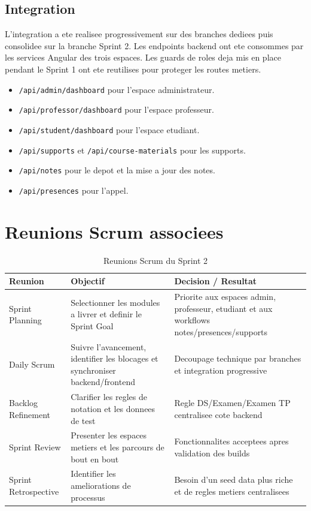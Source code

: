 \documentclass[12pt,a4paper]{report}
\begin{document}
\subsection{Integration}

L'integration a ete realisee progressivement sur des branches dediees puis consolidee sur la branche Sprint 2. Les endpoints backend ont ete consommes par les services Angular des trois espaces. Les guards de roles deja mis en place pendant le Sprint 1 ont ete reutilises pour proteger les routes metiers.

\begin{itemize}[itemsep=0.3em]
    \item \texttt{/api/admin/dashboard} pour l'espace administrateur.
    \item \texttt{/api/professor/dashboard} pour l'espace professeur.
    \item \texttt{/api/student/dashboard} pour l'espace etudiant.
    \item \texttt{/api/supports} et \texttt{/api/course-materials} pour les supports.
    \item \texttt{/api/notes} pour le depot et la mise a jour des notes.
    \item \texttt{/api/presences} pour l'appel.
\end{itemize}

\section{Reunions Scrum associees}

\begin{table}[H]
\centering
\caption{Reunions Scrum du Sprint 2}
\begin{tabular}{|p{3.5cm}|p{6cm}|p{4cm}|}
\hline
\textbf{Reunion} & \textbf{Objectif} & \textbf{Decision / Resultat} \\
\hline
Sprint Planning & Selectionner les modules a livrer et definir le Sprint Goal & Priorite aux espaces admin, professeur, etudiant et aux workflows notes/presences/supports \\
\hline
Daily Scrum & Suivre l'avancement, identifier les blocages et synchroniser backend/frontend & Decoupage technique par branches et integration progressive \\
\hline
Backlog Refinement & Clarifier les regles de notation et les donnees de test & Regle DS/Examen/Examen TP centralisee cote backend \\
\hline
Sprint Review & Presenter les espaces metiers et les parcours de bout en bout & Fonctionnalites acceptees apres validation des builds \\
\hline
Sprint Retrospective & Identifier les ameliorations de processus & Besoin d'un seed data plus riche et de regles metiers centralisees \\
\hline
\end{tabular}
\end{table}
\end{document}
